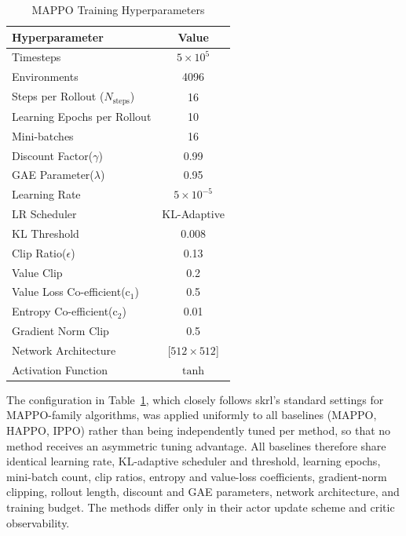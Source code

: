 \documentclass[a4paper,fleqn]{cas-dc}
\begin{document}
\begin{table}[h]
\caption{MAPPO Training Hyperparameters}
\centering
\begin{tabular}{lc}
\midrule 
\textbf{Hyperparameter} & \textbf{Value} \\
\midrule \midrule
Timesteps  & $5 \times 10^{5}$\\
Environments & 4096 \\
Steps per Rollout ($N_{\text{steps}}$) & 16 \\
Learning Epochs per Rollout & 10 \\
Mini-batches& 16 \\
Discount Factor($\gamma$) & 0.99 \\
GAE Parameter($\lambda$) & 0.95 \\
Learning Rate & $5 \times 10^{-5}$ \\
LR Scheduler & KL-Adaptive \\
KL Threshold & 0.008 \\
Clip Ratio($\epsilon$) & 0.13\\
Value Clip & 0.2\\
Value Loss Co-efficient($\text{c}_1$) & 0.5\\
Entropy Co-efficient($\text{c}_2$) & 0.01\\
Gradient Norm Clip & 0.5\\
Network Architecture & [$512 \times 512$]\\
Activation Function & $\tanh$\\
\bottomrule
\end{tabular}
\label{tab:mappo_hyperparameters}
\end{table}

The configuration in Table~\ref{tab:mappo_hyperparameters}, which closely follows skrl's standard settings for MAPPO-family algorithms, was applied uniformly to all baselines (MAPPO, HAPPO, IPPO) rather than being independently tuned per method, so that no method receives an asymmetric tuning advantage. All baselines therefore share identical learning rate, KL-adaptive scheduler and threshold, learning epochs, mini-batch count, clip ratios, entropy and value-loss coefficients, gradient-norm clipping, rollout length, discount and GAE parameters, network architecture, and training budget. The methods differ only in their actor update scheme and critic observability.
\end{document}
